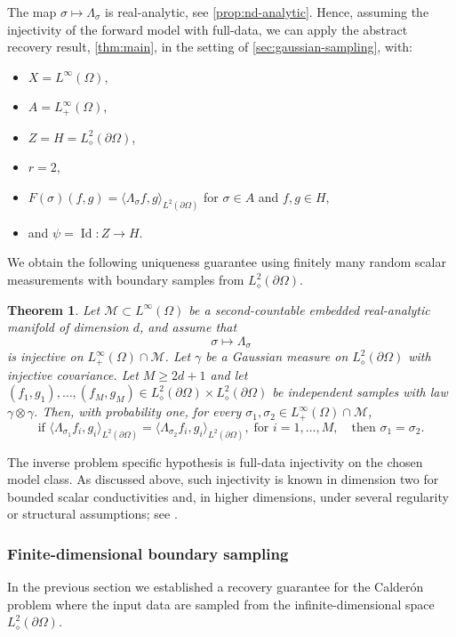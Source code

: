 \documentclass[11pt,oneside]{amsart}
\theoremstyle{plain}
\newtheorem{theorem}{Theorem}[section]
\theoremstyle{definition}
\theoremstyle{remark}
\newcommand{\calM}{\mathcal{M}}
\begin{document}
The map $\sigma\mapsto\Lambda_\sigma$ is real-analytic, see \cref{prop:nd-analytic}. Hence, assuming the injectivity of the forward model with full-data, we can apply the abstract recovery result, \cref{thm:main}, in the setting of \cref{sec:gaussian-sampling}, with:
\begin{itemize}
    \item $X=L^\infty(\Omega)$,
    \item $A=L^\infty_+(\Omega)$,
    \item $Z=H=L^2_\diamond(\partial\Omega)$,
    \item $r=2$,
    \item $F(\sigma)(f,g)=\langle\Lambda_{\sigma} f,g\rangle_{L^2(\partial\Omega)}$ for $\sigma\in A$ and $f,g\in H$,
    \item and $\psi=\operatorname{Id}\colon Z\to H$.
\end{itemize}
We obtain the following uniqueness guarantee using finitely many random scalar measurements with boundary samples from $L^2_\diamond(\partial\Omega)$.

\begin{theorem}\label{thm:calderon-gaussian}
Let $\calM\subset L^\infty(\Omega)$ be a second-countable embedded real-analytic manifold of dimension $d$, and assume that
\[
    \sigma\longmapsto\Lambda_\sigma
\]
is injective on $L^\infty_+(\Omega)\cap\calM$. Let $\gamma$ be a Gaussian measure on $L^2_\diamond(\partial\Omega)$ with injective covariance. Let $M\geq2d+1$ and let $(f_1,g_1),\dots,(f_M,g_M)\in L^2_\diamond(\partial\Omega)\times L^2_\diamond(\partial\Omega)$ be independent samples with law $\gamma\otimes\gamma$. Then, with probability one, for every $\sigma_1,\sigma_2\in L^\infty_+(\Omega)\cap\calM$, 
\[ \text{if }
   \langle\Lambda_{\sigma_1} f_i,g_i\rangle_{L^2(\partial\Omega)}=\langle\Lambda_{\sigma_2} f_i,g_i\rangle_{L^2(\partial\Omega)},\; \text{for } i=1,\dots,M,\quad \text{then } \sigma_1=\sigma_2.
\]
\end{theorem}

The inverse problem specific hypothesis is full-data injectivity on the chosen model class. As discussed above, such injectivity is known in dimension two for bounded scalar conductivities \cite{astala2006calderon} and, in higher dimensions, under several regularity or structural assumptions; see \cite{nachman1996global,sylvester1987global,alessandrini2005lipschitz,alessandrini2017lipschitz,harrach2019uniqueness,haberman2013uniqueness,haberman2015uniqueness,caro2016global}.

\subsubsection{Finite-dimensional boundary sampling}\label{sec:calderon-finite}
In the previous section we established a recovery guarantee for the Calder\'on problem where the input data are sampled from the infinite-dimensional space $L^2_\diamond(\partial\Omega)$.
\end{document}
